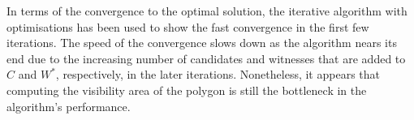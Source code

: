 In terms of the convergence to the optimal solution, the iterative algorithm with optimisations has been used to show the fast convergence in the first few iterations. The speed of the convergence slows down as the algorithm nears its end due to the increasing number of candidates and witnesses that are added to $C$ and $W^*$, respectively, in the later iterations. Nonetheless, it appears that computing the visibility area of the polygon is still the bottleneck in the algorithm's performance.



